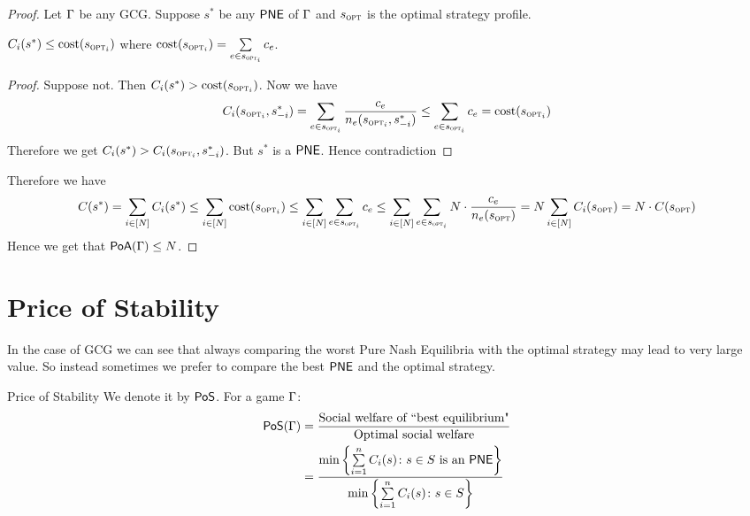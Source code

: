 \begin{proof}
Let $\Gamma$ be any GCG. Suppose $s^*$ be any $\operatorname{\mathsf{PNE}}$ of $\Gamma$ and $s_{\textsc{opt}}$ is the optimal strategy profile. \begin{claimwidth}
	\begin{claim}{}{}
		$C_i(s^*)\leq \text{cost}(s_{\textsc{opt}_i})$ where $\text{cost}(s_{\textsc{opt}_i})=\sum\limits_{e\in s_{\textsc{opt}_i}}c_e$.
	\end{claim}
\begin{proof}
	Suppose not. Then 	$C_i(s^*)> \text{cost}(s_{\textsc{opt}_i})$. Now we have $$C_i(s_{\textsc{opt}_i},s^*_{-i})=\sum\limits_{e\in s_{\textsc{opt}_i}}\frac{c_e}{n_e(s_{\textsc{opt}_i},s^*_{-i})}\leq  \sum\limits_{e\in s_{\textsc{opt}_i}}{c_e}=\text{cost}(s_{\textsc{opt}_i})$$Therefore we get $C_i(s^*)>C_i(s_{\textsc{opt}_i},s^*_{-i})$.   But $s^*$ is a $\operatorname{\mathsf{PNE}}$. Hence contradiction \ctr 
\end{proof}
\end{claimwidth}

Therefore we have $$C(s^*)=\sum\limits_{i\in[N]}C_i(s^*)\leq \sum\limits_{i\in[N]} \text{cost}(s_{\textsc{opt}_i})\leq \sum\limits_{i\in[N]}\sum\limits_{e\in s_{\textsc{opt}_i}}c_e\leq \sum\limits_{i\in[N]}\sum\limits_{e\in s_{\textsc{opt}_i}}N\cdot\frac{c_e}{n_e(s_{\textsc{opt}})}=N\sum\limits_{i\in[N]}C_i(s_{\textsc{opt}})=N\cdot C(s_{\textsc{opt}}) $$Hence we get that $\operatorname{\mathsf{PoA}}(\Gamma)\leq N$.
\end{proof}

\section{Price of Stability}
In the case of GCG we can see that always comparing the worst Pure Nash Equilibria with the optimal strategy may lead to very large value. So instead sometimes we prefer to compare the best $\operatorname{\mathsf{PNE}}$ and the optimal strategy.
\begin{Definition}{Price of Stability}{}
	We denote it by $\operatorname{\mathsf{PoS}}$. For a game $\Gamma$:\begin{align*}
		\operatorname{\mathsf{PoS}}(\Gamma)& =\frac{\text{Social welfare of ``best equilibrium"}}{\text{Optimal social welfare}}\\
		&= \frac{\min\left\{\sum\limits_{i=1}^n C_i(s)\colon s\in S\text{ is an $\operatorname{\mathsf{PNE}}$}\right\}}{\min\left\{\sum\limits_{i=1}^n C_i(s)\colon s\in S\right\}}
	\end{align*}
\end{Definition}

